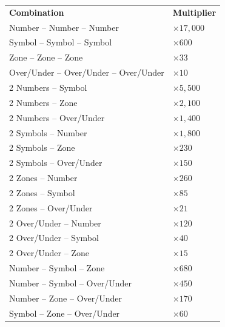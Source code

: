 \begin{center}
\begin{tabular}{ll}
\textbf{Combination} & \textbf{Multiplier} \\
Number -- Number -- Number & $\times 17{,}000$ \\
Symbol -- Symbol -- Symbol & $\times 600$ \\
Zone -- Zone -- Zone & $\times 33$ \\
Over/Under -- Over/Under -- Over/Under & $\times 10$ \\
2 Numbers -- Symbol & $\times 5{,}500$ \\
2 Numbers -- Zone & $\times 2{,}100$ \\
2 Numbers -- Over/Under & $\times 1{,}400$ \\
2 Symbols -- Number & $\times 1{,}800$ \\
2 Symbols -- Zone & $\times 230$ \\
2 Symbols -- Over/Under & $\times 150$ \\
2 Zones -- Number & $\times 260$ \\
2 Zones -- Symbol & $\times 85$ \\
2 Zones -- Over/Under & $\times 21$ \\
2 Over/Under -- Number & $\times 120$ \\
2 Over/Under -- Symbol & $\times 40$ \\
2 Over/Under -- Zone & $\times 15$ \\
Number -- Symbol -- Zone & $\times 680$ \\
Number -- Symbol -- Over/Under & $\times 450$ \\
Number -- Zone -- Over/Under & $\times 170$ \\
Symbol -- Zone -- Over/Under & $\times 60$ \\
\end{tabular}
\end{center}
